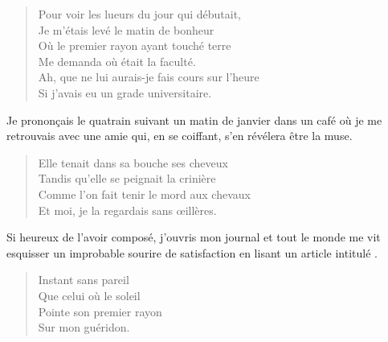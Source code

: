 \begin{verse}%
  \sizain%
  Pour voir les lueurs du jour qui débutait,\\  %
  Je m’étais levé le matin de bonheur\\  %
  Où le premier rayon ayant touché terre\\  %
  Me demanda où était la faculté.\\  %
  Ah, que ne lui aurais-je fais cours sur l’heure\\  %
  Si j’avais eu un grade universitaire.
\end{verse}

\begin{prose}
  Je prononçais le quatrain suivant un matin de janvier dans un café où je me retrouvais avec une amie  qui, en se coiffant, s’en révélera être la muse.
\end{prose}

\begin{verse}%
  \sizain%
  Elle tenait dans sa bouche ses cheveux\\  %
  Tandis qu’elle se peignait la crinière\\  %
  Comme l’on fait tenir le mord aux chevaux\\  %
  Et moi, je la regardais sans œillères.
\end{verse}

\begin{prose}
  Si heureux de l’avoir composé, j’ouvris mon journal et tout le monde me vit esquisser un improbable sourire de satisfaction en lisant un article intitulé .
\end{prose}

\begin{verse}%
  \sizain%
  Instant sans pareil\\  %
  Que celui où le soleil\\  %
  Pointe son premier rayon\\  %
  Sur mon guéridon.
\end{verse}

